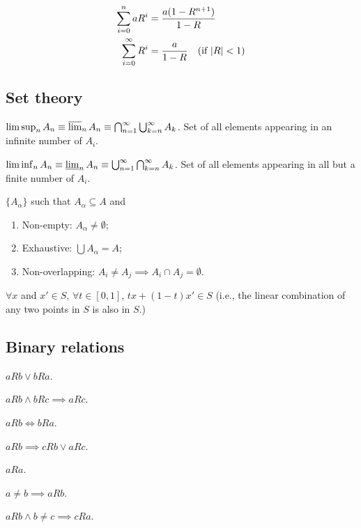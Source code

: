 \documentclass[8pt,letterpaper, landscape]{extarticle} %
\begin{document}
\begin{multicols}{3}
\begin{description}
\begin{align*}
\sum_{i=0}^{n} a R^i &= \frac{a(1 - R^{n+1})}{1 - R} \\
\sum_{i=0}^{\infty} R^i &= \frac{a}{1 - R} \quad \text{(if $ \lvert R \rvert < 1 $)}
\end{align*}

\subsection{Set theory}
 $ \limsup_n A_n \equiv \varlimsup_n A_n \equiv \bigcap_{n=1}^{\infty} \bigcup_{k=n}^{\infty} A_k $. Set of all elements appearing in an infinite number of $ A_i $.

 $ \liminf_n A_n \equiv \varliminf_n A_n \equiv \bigcup_{n=1}^{\infty} \bigcap_{k=n}^{\infty} A_k $. Set of all elements appearing in all but a finite number of $ A_i $.

 $ \{ A_\alpha \} $ such that $ A_\alpha \subseteq A $ and
\begin{enumerate}
\item Non-empty: $ A_\alpha \neq \emptyset $;
\item Exhaustive: $ \bigcup A_\alpha = A $;
\item Non-overlapping: $ A_i \neq A_j \implies A_i \cap A_j = \emptyset $.
\end{enumerate}

 $ \forall x $ and $ x' \in S $, $ \forall t \in [0,1] $, $ tx + (1-t)x' \in S $ (i.e., the linear combination of any two points in $ S $ is also in $ S $.)

\subsection{Binary relations}
 $ aRb \lor bRa $.

 $ aRb \land bRc \implies aRc $.

 $ aRb \iff bRa $.

 $ aRb \implies cRb \lor aRc $.

 $ aRa $.

 $ a \neq b \implies aRb $.

 $ aRb \land b \neq c \implies cRa $.


\end{description}
\end{multicols}
\end{document}
